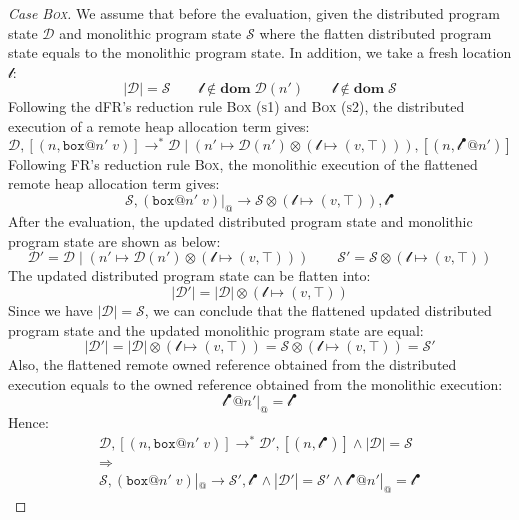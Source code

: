 \begin{proof}[Case \textsc{\emph{Box}}]
We assume that before the evaluation, given the distributed program state $\mathcal{D}$ and monolithic program state $\mathcal{S}$ where the flatten distributed program state equals to the monolithic program state. In addition, we take a fresh location $\mathscr{l}$:
\[
|\mathcal{D}| = \mathcal{S} \quad\quad \mathscr{l} \notin \textbf{dom}\; \mathcal{D}(n') \quad\quad \mathscr{l} \notin \textbf{dom}\; \mathcal{S}
\]
Following the dFR's reduction rule \textsc{Box (s1)} and \textsc{Box (s2)}, the distributed execution of a remote heap allocation term gives:
\[
\mathcal{D}, [(n, \texttt{box}@n'\;v)] \longrightarrow^* \mathcal{D} \mid (n' \mapsto \mathcal{D}(n')\otimes(\mathscr{l} \mapsto (v, \top))), [(n, \mathscr{l}^\bullet@n')]
\]
Following FR's reduction rule \textsc{Box}, the monolithic execution of the flattened remote heap allocation term gives:
\[
\mathcal{S}, (\texttt{box}@n'\;v)|_@ \longrightarrow \mathcal{S} \otimes (\mathscr{l} \mapsto (v, \top)), \mathscr{l}^\bullet
\]
After the evaluation, the updated distributed program state and monolithic program state are shown as below:
\[
\mathcal{D}' = \mathcal{D} \mid (n' \mapsto \mathcal{D}(n')\otimes(\mathscr{l} \mapsto (v, \top))) \quad\quad 
\mathcal{S}' = \mathcal{S} \otimes (\mathscr{l} \mapsto (v, \top))
\]
The updated distributed program state can be flatten into:
\[|\mathcal{D}'| = |\mathcal{D}| \otimes (\mathscr{l} \mapsto (v, \top))\]
Since we have $|\mathcal{D}| = \mathcal{S}$, we can conclude that the flattened updated distributed program state and the updated monolithic program state are equal:
\[|\mathcal{D}'| = |\mathcal{D}| \otimes (\mathscr{l} \mapsto (v, \top)) = \mathcal{S} \otimes (\mathscr{l} \mapsto (v, \top))= \mathcal{S}'\]
Also, the flattened remote owned reference obtained from the distributed execution equals to the owned reference obtained from the monolithic execution:
\[\mathscr{l}^\bullet@n'|_@ = \mathscr{l}^\bullet\]
Hence:
\begin{gather*}
\mathcal{D}, [(n, \texttt{box}@n'\;v)] \longrightarrow^* \mathcal{D'}, [(n, \mathscr{l}^\bullet)] \land |\mathcal{D}| = \mathcal{S} \\\Rightarrow\\ \mathcal{S},  (\texttt{box}@n'\;v)|_@ \longrightarrow \mathcal{S'}, \mathscr{l}^\bullet \land |\mathcal{D}'| = \mathcal{S}' \land \mathscr{l}^\bullet@n'|_@ = \mathscr{l}^\bullet
\end{gather*}

\end{proof}
